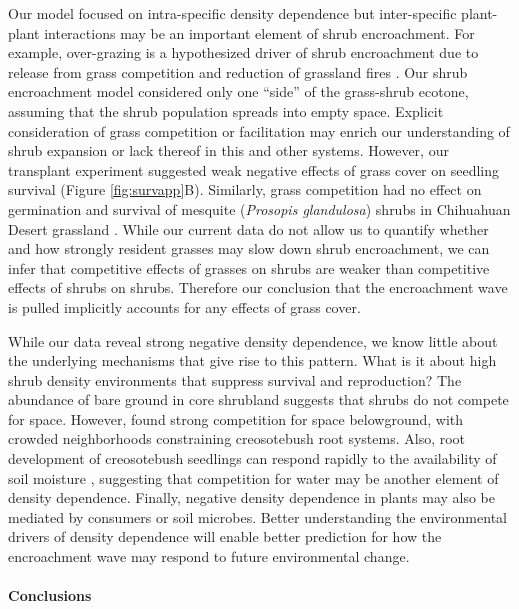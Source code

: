 \documentclass[11pt]{article}\usepackage[]{graphicx}\usepackage[]{color}
\begin{document}
Our model focused on intra-specific density dependence but inter-specific plant-plant interactions may be an important element of shrub encroachment.
For example, over-grazing is a hypothesized driver of shrub encroachment due to release from grass competition and reduction of grassland fires \citep{van2000shrub}. 
Our shrub encroachment model considered only one ``side'' of the grass-shrub ecotone, assuming that the shrub population spreads into empty space. 
Explicit consideration of grass competition or facilitation may enrich our understanding of shrub expansion or lack thereof in this and other systems. 
However, our transplant experiment suggested weak negative effects of grass cover on seedling survival (Figure \ref{fig:survapp}B).
Similarly, grass competition had no effect on germination and survival of mesquite (\textit{Prosopis glandulosa}) shrubs in Chihuahuan Desert grassland \citep{weber2022woody}. 
While our current data do not allow us to quantify whether and how strongly resident grasses may slow down shrub encroachment, we can infer that competitive effects of grasses on shrubs are weaker than competitive effects of shrubs on shrubs.
Therefore our conclusion that the encroachment wave is pulled implicitly accounts for any effects of grass cover. 

While our data reveal strong negative density dependence, we know little about the underlying mechanisms that give rise to this pattern. 
What is it about high shrub density environments that suppress survival and reproduction?
The abundance of bare ground in core shrubland suggests that shrubs do not compete for space. 
However, \cite{brisson1994effect} found strong competition for space belowground, with crowded neighborhoods constraining creosotebush root systems. 
Also, root development of creosotebush seedlings can respond rapidly to the availability of soil moisture \citep{obrist2003increasing}, suggesting that competition for water may be another element of density dependence. 
Finally, negative density dependence in plants may also be mediated by consumers or soil microbes. 
Better understanding the environmental drivers of density dependence will enable better prediction for how the encroachment wave may respond to future environmental change.

\paragraph{Conclusions}
\end{document}

